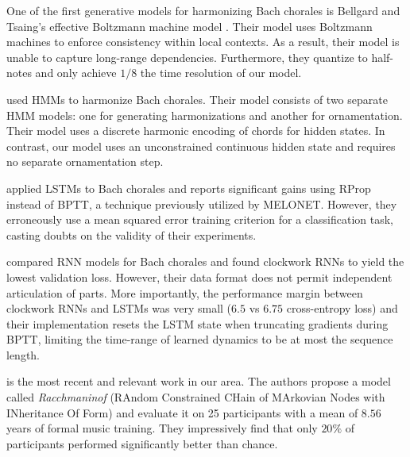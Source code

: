 One of the first generative models for harmonizing Bach chorales is Bellgard
and Tsaing's effective Boltzmann machine model \citep{bellgard1994harmonizing}. Their model
uses Boltzmann machines to enforce consistency within local contexts. As a result,
their model is unable to capture long-range dependencies. Furthermore, they quantize
to half-notes and only achieve $1/8$ the time resolution of our model.

\citet{Allan2005} used HMMs to harmonize Bach chorales. Their model consists of
two separate HMM models: one for generating harmonizations and another for
ornamentation. Their model uses a discrete harmonic encoding of chords for
hidden states. In contrast, our model uses an unconstrained continuous hidden
state and requires no separate ornamentation step.

\citet{Liu2014} applied LSTMs to Bach chorales and reports significant gains
using RProp instead of BPTT, a technique previously utilized by
MELONET\citep{feulner1994melonet}. However, they erroneously use a mean squared
error training criterion for a classification task, casting doubts on the
validity of their experiments.

\citet{Brien2016} compared RNN models for Bach chorales and found clockwork RNNs to
yield the lowest validation loss. However, their data format does not permit
independent articulation of parts. More importantly, the performance margin between
clockwork RNNs and LSTMs was very small ($6.5$ vs $6.75$ cross-entropy loss) and their
implementation resets the LSTM state when truncating gradients during BPTT, limiting the
time-range of learned dynamics to be at most the sequence length.

\citet{collins2016developing} is the most recent and relevant work in our area.
The authors propose a model called \emph{Racchmaninof} (RAndom Constrained
CHain of MArkovian Nodes with INheritance Of Form) and evaluate it on 25
participants with a mean of $8.56$ years of formal music training. They
impressively find that only $20\%$ of participants performed significantly
better than chance. 

